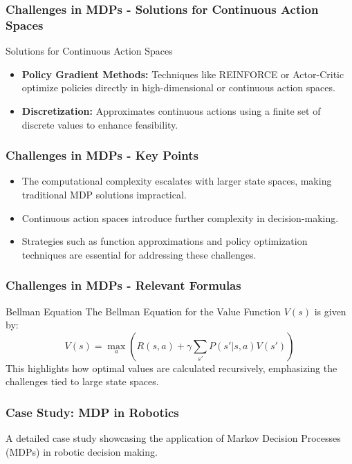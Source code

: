 \documentclass[aspectratio=169]{beamer}
\begin{document}
\begin{frame}[fragile]
  \frametitle{Challenges in MDPs - Solutions for Continuous Action Spaces}
  \begin{block}{Solutions for Continuous Action Spaces}
    \begin{itemize}
      \item \textbf{Policy Gradient Methods:} Techniques like REINFORCE or Actor-Critic optimize policies directly in high-dimensional or continuous action spaces.
      \item \textbf{Discretization:} Approximates continuous actions using a finite set of discrete values to enhance feasibility.
    \end{itemize}
  \end{block}
\end{frame}

\begin{frame}[fragile]
  \frametitle{Challenges in MDPs - Key Points}
  \begin{itemize}
    \item The computational complexity escalates with larger state spaces, making traditional MDP solutions impractical.
    \item Continuous action spaces introduce further complexity in decision-making.
    \item Strategies such as function approximations and policy optimization techniques are essential for addressing these challenges.
  \end{itemize}
\end{frame}

\begin{frame}[fragile]
  \frametitle{Challenges in MDPs - Relevant Formulas}
  \begin{block}{Bellman Equation}
    The Bellman Equation for the Value Function \( V(s) \) is given by:
    \begin{equation}
      V(s) = \max_a \left( R(s, a) + \gamma \sum_{s'} P(s'|s, a)V(s') \right)
    \end{equation}
    This highlights how optimal values are calculated recursively, emphasizing the challenges tied to large state spaces.
  \end{block}
\end{frame}

\begin{frame}[fragile]
    \frametitle{Case Study: MDP in Robotics}
    A detailed case study showcasing the application of Markov Decision Processes (MDPs) in robotic decision making.
\end{frame}
\end{document}
